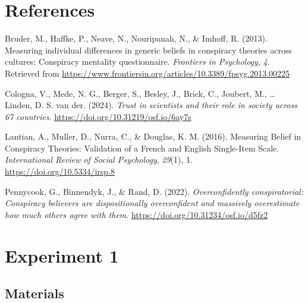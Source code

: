\documentclass[
  doc,floatsintext]{apa6}
\newlength{\cslhangindent}
\newlength{\cslentryspacingunit} %
\newenvironment{CSLReferences}[2] %
 {%
  \setlength{\parindent}{0pt}
  \ifodd #1
  \let\oldpar\par
  \def\par{\hangindent=\cslhangindent\oldpar}
  \fi
  \setlength{\parskip}{#2\cslentryspacingunit}
 }%
 {}
\begin{document}
\FloatBarrier

\hypertarget{references}{%
\section{References}\label{references}}

\hypertarget{refs}{}
\begin{CSLReferences}{1}{0}
\leavevmode{}%
Bruder, M., Haffke, P., Neave, N., Nouripanah, N., \& Imhoff, R. (2013). Measuring individual differences in generic beliefs in conspiracy theories across cultures: Conspiracy mentality questionnaire. \emph{Frontiers in Psychology}, \emph{4}. Retrieved from \url{https://www.frontiersin.org/articles/10.3389/fpsyg.2013.00225}

\leavevmode{}%
Cologna, V., Mede, N. G., Berger, S., Besley, J., Brick, C., Joubert, M., \ldots{} Linden, D. S. van der. (2024). \emph{Trust in scientists and their role in society across 67 countries}. \url{https://doi.org/10.31219/osf.io/6ay7s}

\leavevmode{}%
Lantian, A., Muller, D., Nurra, C., \& Douglas, K. M. (2016). Measuring Belief in Conspiracy Theories: Validation of a French and English Single-Item Scale. \emph{International Review of Social Psychology}, \emph{29}(1), 1. \url{https://doi.org/10.5334/irsp.8}

\leavevmode{}%
Pennycook, G., Binnendyk, J., \& Rand, D. (2022). \emph{Overconfidently conspiratorial: Conspiracy believers are dispositionally overconfident and massively overestimate how much others agree with them}. \url{https://doi.org/10.31234/osf.io/d5fz2}

\end{CSLReferences}

\newpage

\hypertarget{appendix-appendix}{%
\appendix}


\hypertarget{exp1}{%
\section{Experiment 1}\label{exp1}}

\hypertarget{materials-1}{%
\subsection{Materials}\label{materials-1}}
\end{document}
